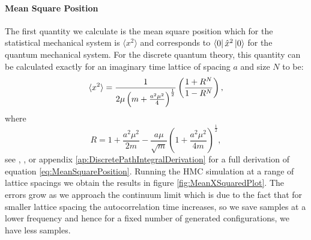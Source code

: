 \documentclass[12pt]{article}
\begin{document}
            \paragraph{Mean Square Position}
                The first quantity we calculate is the mean square position which for the statistical mechanical system is $\langle x^2 \rangle$ and corresponds to $\bra{0}\hat{x}^2\ket{0}$ for the quantum mechanical system. For the discrete quantum theory, this quantity can be calculated exactly for an imaginary time lattice of spacing $a$ and size $N$ to be: 
                \begin{equation}
                    \label{eq:MeanSquarePosition}
                    \braket{x^2} = \frac{1}{2\mu\left(m+\frac{a^2\mu^2}{4}\right)^\frac{1}{2}}\left(\frac{1+R^N}{1-R^N}\right),
                \end{equation}
                where
                \begin{equation}
                    \label{eq:R}
                    R = 1 + \frac{a^2\mu^2}{2m} - \frac{a\mu}{\sqrt{m}}\left( 1 + \frac{a^2\mu^2}{4m}\right)^{\frac{1}{2}},
                \end{equation}
                see \cite{creutz_freedman_1981}, \cite{slapik_serenone}, \cite{westbroek_king_vvedensky_durr_2017} or appendix \ref{ap:DiscretePathIntegralDerivation} for a full derivation of equation \ref{eq:MeanSquarePosition}. Running the HMC simulation at a range of lattice spacings we obtain the results in figure \ref{fig:MeanXSquaredPlot}. The errors grow as we approach the continuum limit which is due to the fact that for smaller lattice spacing the autocorrelation time increases, so we save samples at a lower frequency and hence for a fixed number of generated configurations, we have less samples.
\end{document}
